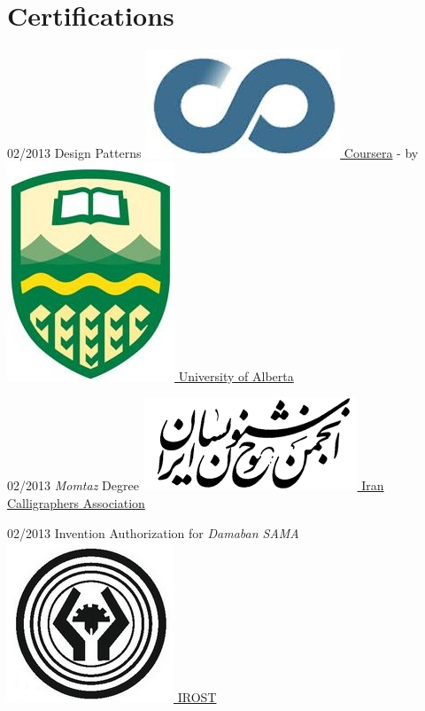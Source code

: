 \documentclass[a4paper]{friggeri-cv}
\begin{document}
\section{Certifications}
\begin{entrylist}
  \entry
    {02/2013}
    {Design Patterns}
    {\href{http://coursera.org}{\includegraphics[scale=0.08]{img/Coursera_logo.jpg} Coursera} -  by \href{https://www.ualberta.ca/}{\includegraphics[scale=0.05]{img/UAlberta_logo.jpg} University of Alberta}}
    {}

    \entry
     {02/2013}
   {\emph{Momtaz} Degree}
    {\href{http://calligraphers.ir/}{\includegraphics[scale=0.15]{img/Khoshnevisan_logo.png} Iran Calligraphers Association}}
    {}
    
    \entry
     {02/2013}
   {Invention Authorization for \emph{Damaban SAMA}}
    {\href{http://www.irost.org/}{\includegraphics[scale=0.09]{img/IROST_logo.jpg} IROST}}
    {}
    
\end{entrylist}

\end{document}
